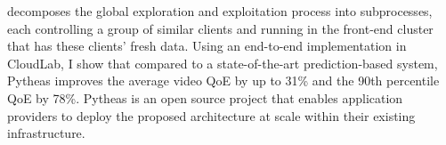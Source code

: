 decomposes the global exploration and exploitation process into subprocesses, each controlling a group of similar clients and running in the front-end cluster that has these clients' fresh data.
Using an end-to-end implementation in CloudLab, I show that compared to a state-of-the-art prediction-based system, Pytheas improves the average video QoE by up to 31\% and the 90th percentile QoE by 78\%.
Pytheas is an open source project that enables application providers to deploy the proposed architecture at scale within their existing infrastructure. 

 
